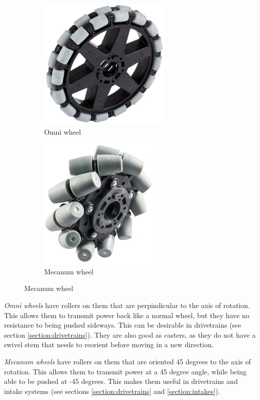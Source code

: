 \documentclass[10pt,letterpaper]{book}
\begin{document}
	\begin{figure}[H]
		\begin{subfigure}[b]{.45\linewidth}
			\includegraphics[height=2.5in]{imgs/wheel_omni.png}
			\caption{Omni wheel}
		\end{subfigure}\begin{subfigure}[b]{.45\linewidth}
			\includegraphics[height=2.5in]{imgs/wheel_mecanum.png}
			\caption{Mecanum wheel}
		\end{subfigure}
	\end{figure}
	
	\begin{asparaenum}[a)]
		\item \textit{Omni wheels} have rollers on them that are perpindicular to the axis of rotation. This allows them to transmit power back like a normal wheel, but they have no resistance to being pushed sideways. This can be desirable in drivetrains (see section \ref{section:drivetrains}). They are also good as casters, as they do not have a swivel stem that needs to reorient before moving in a new direction.
		\item \textit{Mecanum wheels} have rollers on them that are oriented 45 degrees to the axis of rotation. This allows them to transmit power at a 45 degree angle, while being able to be pushed at -45 degrees. This makes them useful in drivetrains and intake systems (see sections \ref{section:drivetrains} and \ref{section:intakes}).
	\end{asparaenum}
\end{document}
